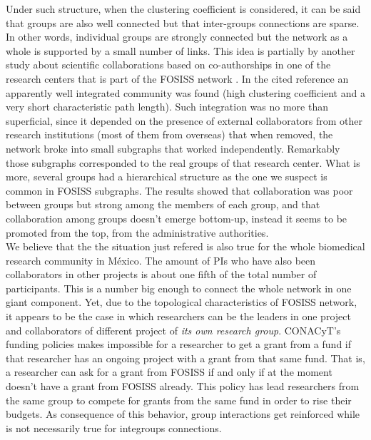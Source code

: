\documentclass[11pt]{article}
\begin{document}
{{\color{red}Under such structure, when the clustering coefficient is considered, it can be said that groups are also well connected
but that inter-groups connections are sparse. In other words, individual groups are strongly connected but the network
as a whole is supported by a small number of links. This idea is partially by
another study about scientific collaborations based on co-authorships in one of
the research centers that is part 
of the FOSISS network \cite{HernandezLemus2013}. In the cited reference an apparently well integrated community was
found (high clustering coefficient and a very short characteristic path length). Such integration was no more than
superficial, since it depended on the presence of external collaborators from other research institutions (most of them from overseas) that when removed,
the network broke into small subgraphs that worked independently. Remarkably those subgraphs corresponded to the real
groups of that research center.  What is more, several groups had a hierarchical structure as 
the one we suspect is common in FOSISS subgraphs. The results showed that collaboration was poor between groups but strong
among the members of each group, and that collaboration among groups doesn't emerge bottom-up, instead it seems to be promoted from the
top, from the administrative authorities.}\\ 

{\color{red}We believe that the the situation just refered is also true for the whole biomedical research community in M\'exico. The
amount of PIs who have also been collaborators in other projects is about one fifth of the total number of participants.
This is a number big enough to connect the whole network in one giant component. Yet, due to the topological
characteristics of FOSISS network, it appears to be the case in which researchers can be the leaders in one project and
collaborators of different project of \emph{its own research group}. CONACyT's funding policies makes impossible for a
researcher to get a grant from a fund if that researcher has an ongoing project with a grant from that same fund. That
is, a researcher can ask for a grant from FOSISS if and only if at the moment
doesn't have a grant from FOSISS already. This
policy has lead researchers from the same group to compete for grants from the same fund in order to rise their
budgets. As consequence of this behavior, group interactions get reinforced while is not necessarily true for integroups
connections.}\\

}
\end{document}
